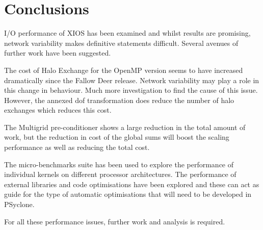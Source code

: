 \documentclass[11pt]{article}
\begin{document}



\section{Conclusions}
I/O
performance of XIOS has been examined and whilst results are promising,
network variability makes definitive statements difficult. Several
avenues of further work have been suggested.

The cost of Halo Exchange for the OpenMP version seems to have
increased dramatically since the Fallow Deer release. Network
variability may play a role 
in this change in behaviour. Much
more investigation to find the cause of this issue. However, the
annexed dof transformation does reduce the number of halo exchanges
which reduces this cost. 

The Multigrid pre-conditioner shows a large reduction in the total
amount of work, but the reduction in cost of the global sums will
boost the scaling performance as well as reducing the total cost.

The micro-benchmarks suite has been used to explore the performance of
individual kernels on different processor architectures. The
performance of external
libraries and code optimisations have been explored and these can act
as guide for the type of automatic optimisations that will need to be
developed in PSyclone. 

For all these performance issues, further work and analysis is
required. 





\end{document}
